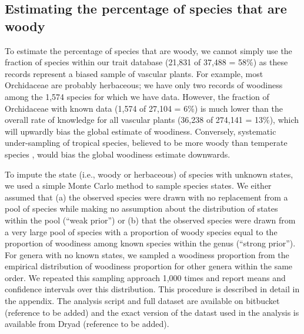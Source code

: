 \documentclass[12pt]{article}
\begin{document}

\subsection{Estimating the percentage of species that are woody}

To estimate the percentage of species that are woody, we cannot simply
use the fraction of species within our trait database (21,831 of
37,488 = 58\%) as these records represent a biased sample of vascular
plants.
For example, most Orchidaceae are probably herbaceous; we have only
two records of woodiness among the 1,574 species for which we have
data.
However, the fraction of Orchidaceae with known data (1,574 of 27,104
= 6\%)
is much lower than the overall rate of knowledge for all vascular
plants (36,238 of 274,141 = 13\%), which will upwardly bias the global
estimate of woodiness.
%
Conversely, systematic under-sampling of tropical species, believed to
be more woody than temperate species \citep{Molesheihgt}, would bias
the global woodiness estimate downwards.

To impute the state (i.e., woody or herbaceous) of species with
unknown states, we used a simple Monte Carlo method to sample species
states.  We either assumed that (a) the observed species were drawn
with no replacement from a pool of species while making no assumption
about the distribution of states within the pool (``weak prior'') or
(b) that the observed species were drawn from a very large pool of
species with a proportion of woody species equal to the proportion of
woodiness among known species within the genus (``strong prior'').
%
For genera with no known states, we sampled a woodiness proportion
from the empirical distribution of woodiness proportion for other
genera within the same order.
%
We repeated this sampling approach 1,000 times and report means and
confidence intervals over this distribution.
%
This procedure is described in detail in the appendix.  The analysis
script and full dataset are available on bitbucket (reference to be
added) and the exact version of the datast used in the analysis is
available from Dryad (reference to be added).
\end{document}
